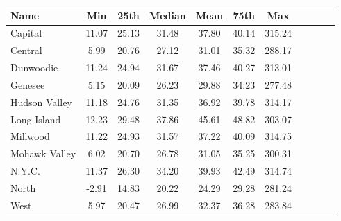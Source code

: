 \begin{tabular}{lcccccccccc}
\toprule
          Name &   Min &  25th &  Median &  Mean &  75th &    Max \\
\midrule
       Capital & 11.07 & 25.13 &   31.48 & 37.80 & 40.14 & 315.24 \\
       Central &  5.99 & 20.76 &   27.12 & 31.01 & 35.32 & 288.17 \\
     Dunwoodie & 11.24 & 24.94 &   31.67 & 37.46 & 40.27 & 313.01 \\
       Genesee &  5.15 & 20.09 &   26.23 & 29.88 & 34.23 & 277.48 \\
 Hudson Valley & 11.18 & 24.76 &   31.35 & 36.92 & 39.78 & 314.17 \\
   Long Island & 12.23 & 29.48 &   37.86 & 45.61 & 48.82 & 303.07 \\
      Millwood & 11.22 & 24.93 &   31.57 & 37.22 & 40.09 & 314.75 \\
 Mohawk Valley &  6.02 & 20.70 &   26.78 & 31.05 & 35.25 & 300.31 \\
        N.Y.C. & 11.37 & 26.30 &   34.20 & 39.93 & 42.49 & 314.74 \\
         North & -2.91 & 14.83 &   20.22 & 24.29 & 29.28 & 281.24 \\
          West &  5.97 & 20.47 &   26.99 & 32.37 & 36.28 & 283.84 \\
\bottomrule
\end{tabular}
